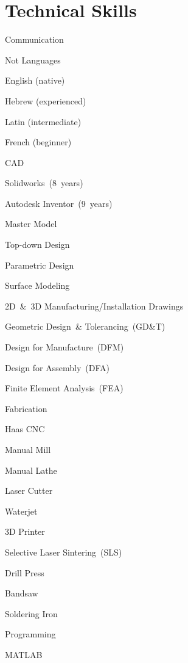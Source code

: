 \documentclass{resume}
\begin{document}
\section{Technical Skills}
\begin{skills}{Communication}
  \begin{groupitem}{Not Languages}
    \item English (native)
    \item Hebrew (experienced)
    \item Latin (intermediate)
    \item French (beginner)
  \end{groupitem}
  \begin{groupitem}{CAD}
    \item Solidworks~(8~years)
    \item Autodesk Inventor~(9~years)
    \item Master Model
    \item Top-down Design
    \item Parametric Design
    \item Surface Modeling
    \item 2D~\&~3D Manufacturing/Installation Drawings
    \item Geometric Design~\& Tolerancing~(GD\&T)
    \item Design for Manufacture~(DFM)
    \item Design for Assembly~(DFA)
    \item Finite Element Analysis~(FEA)
  \end{groupitem}
  \begin{groupitem}{Fabrication}
    \item Haas CNC
    \item Manual Mill
    \item Manual Lathe
    \item Laser Cutter
    \item Waterjet
    \item 3D Printer
    \item Selective Laser Sintering~(SLS)
    \item Drill Press
    \item Bandsaw
    \item Soldering Iron
  \end{groupitem}
  \begin{groupitem}{Programming}
    \item MATLAB

\end{groupitem}
\end{skills}
\end{document}
